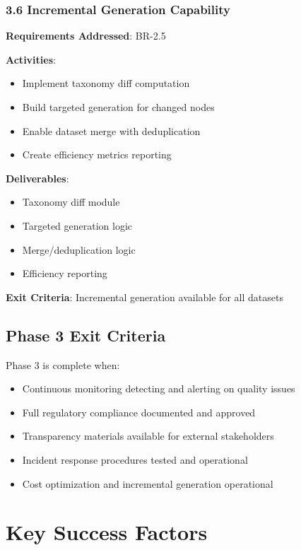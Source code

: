 \documentclass[12pt,a4paper,twoside]{report}
\begin{document}
\subsubsection{3.6 Incremental Generation Capability}

\begin{tcolorbox}[colback=orange!5,colframe=orange!70,title=3.6 Dataset Evolution]
\textbf{Requirements Addressed}: BR-2.5

\textbf{Activities}:
\begin{itemize}
\item Implement taxonomy diff computation
\item Build targeted generation for changed nodes
\item Enable dataset merge with deduplication
\item Create efficiency metrics reporting
\end{itemize}

\textbf{Deliverables}:
\begin{itemize}
\item Taxonomy diff module
\item Targeted generation logic
\item Merge/deduplication logic
\item Efficiency reporting
\end{itemize}

\textbf{Exit Criteria}: Incremental generation available for all datasets
\end{tcolorbox}

\subsection{Phase 3 Exit Criteria}

Phase 3 is complete when:
\begin{itemize}
\item[\checkmark] Continuous monitoring detecting and alerting on quality issues
\item[\checkmark] Full regulatory compliance documented and approved
\item[\checkmark] Transparency materials available for external stakeholders
\item[\checkmark] Incident response procedures tested and operational
\item[\checkmark] Cost optimization and incremental generation operational
\end{itemize}


\section{Key Success Factors}
\end{document}
